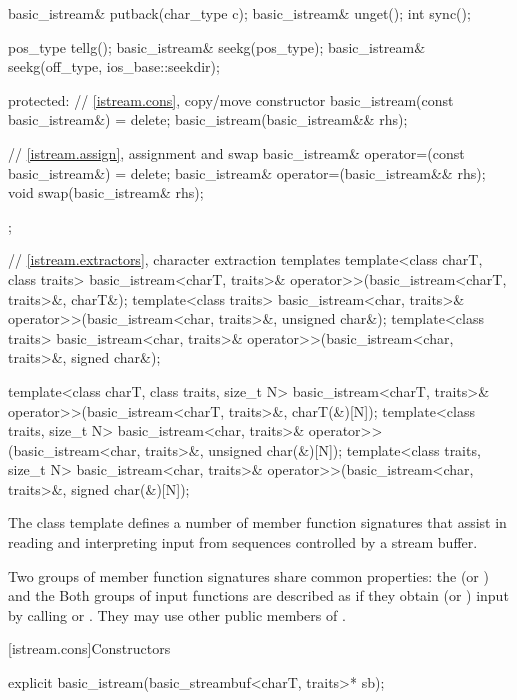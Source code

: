 \begin{codeblock}
{{    basic_istream& putback(char_type c);
    basic_istream& unget();
    int sync();

    pos_type tellg();
    basic_istream& seekg(pos_type);
    basic_istream& seekg(off_type, ios_base::seekdir);

  protected:
    // \ref{istream.cons}, copy/move constructor
    basic_istream(const basic_istream&) = delete;
    basic_istream(basic_istream&& rhs);

    // \ref{istream.assign}, assignment and swap
    basic_istream& operator=(const basic_istream&) = delete;
    basic_istream& operator=(basic_istream&& rhs);
    void swap(basic_istream& rhs);
  };

  // \ref{istream.extractors}, character extraction templates
  template<class charT, class traits>
    basic_istream<charT, traits>& operator>>(basic_istream<charT, traits>&, charT&);
  template<class traits>
    basic_istream<char, traits>& operator>>(basic_istream<char, traits>&, unsigned char&);
  template<class traits>
    basic_istream<char, traits>& operator>>(basic_istream<char, traits>&, signed char&);

  template<class charT, class traits, size_t N>
    basic_istream<charT, traits>& operator>>(basic_istream<charT, traits>&, charT(&)[N]);
  template<class traits, size_t N>
    basic_istream<char, traits>& operator>>(basic_istream<char, traits>&, unsigned char(&)[N]);
  template<class traits, size_t N>
    basic_istream<char, traits>& operator>>(basic_istream<char, traits>&, signed char(&)[N]);
}
\end{codeblock}

\pnum
The class template
defines a number of member function
signatures that assist in reading and interpreting input from sequences
controlled by a stream buffer.

\pnum
Two groups of member function signatures share common properties:
the
(or
)
and the
Both groups of input functions are described as if they obtain (or
)
input
by calling
or
.
They may use other public members of
.

[istream.cons]{Constructors}

%
\begin{itemdecl}
explicit basic_istream(basic_streambuf<charT, traits>* sb);
\end{itemdecl}

